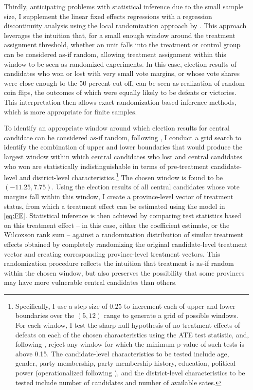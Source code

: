 \documentclass[12pt]{article}
\newcommand{\1}{\mathbbm{1}}
\begin{document}
Thirdly, anticipating problems with statistical inference due to the small sample size, I supplement the linear fixed effects regressions with a regression discontinuity analysis using the local randomization approach by \citep{CattaneoTitiunik2015}. This approach leverages the intuition that, for a small enough window around the treatment assignment threshold, whether an unit falls into the treatment or control group can be considered as-if random, allowing treatment assignment within this window to be seen as randomized experiments. In this case, election results of candidates who won or lost with very small vote margins, or whose vote shares were close enough to the 50 percent cut-off, can be seen as realization of random coin flips, the outcomes of which were equally likely to be defeats or victories. This interpretation then allows exact randomization-based inference methods, which is more appropriate for finite samples.

To identify an appropriate window around which election results for central candidate can be considered as-if random, following \citet{CattaneoTitiunik2015}, I conduct a grid search to identify the combination of upper and lower boundaries that would produce the largest window within which central candidates who lost and central candidates who won are statistically indistinguishable in terms of pre-treatment candidate-level and district-level characteristics.\footnote{Specifically, I use a step size of $0.25$ to increment each of upper and lower boundaries over the $(5, 12)$ range to generate a grid of possible windows. For each window, I test the sharp null hypothesis of no treatment effects of defeats on each of the chosen characteristics using the ATE test statistic, and, following \citet{CattaneoTitiunik2015}, reject any window for which the minimum p-value of such tests is above 0.15. The candidate-level characteristics to be tested include age, gender, party membership, party membership history, education, political power (operationalized following \citet{MaleskySchuler2011}), and the district-level characteristics to be tested include number of candidates and number of available sates.} The chosen window is found to be $(-11.25, 7.75)$. Using the election results of all central candidates whose vote margins fall within this window, I create a province-level vector of treatment status, from which a treatment effect can be estimated using the model in \ref{eq:FE}. Statistical inference is then achieved by comparing test statistics based on this treatment effect -- in this case, either the coefficient estimate, or the Wilcoxson rank sum --  against a randomization distribution of similar treatment effects obtained by completely randomizing the original candidate-level treatment vector and creating corresponding province-level treatment vectors. This randomization procedure reflects the intuition that treatment is as-if random within the chosen window, but also preserves the possibility that some provinces may have more vulnerable central candidates than others.
\end{document}
